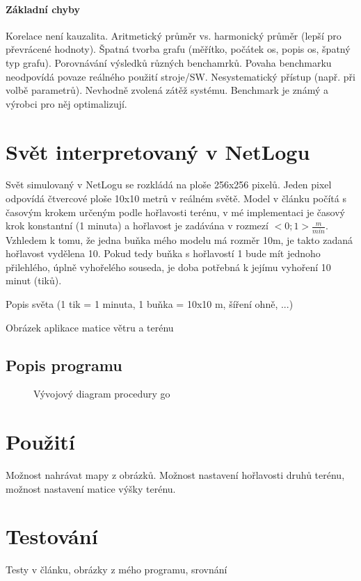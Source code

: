 \documentclass[11pt,a4paper]{scrartcl}
\begin{document}
	
	\paragraph{Základní chyby} Korelace není kauzalita. Aritmetický průměr vs. harmonický průměr (lepší pro převrácené hodnoty). Špatná tvorba grafu (měřítko, počátek os, popis os, špatný typ grafu). Porovnávání výsledků různých benchamrků. Povaha benchmarku neodpovídá povaze reálného použití stroje/SW. Nesystematický přístup (např. při volbě parametrů). Nevhodně zvolená zátěž systému. Benchmark je známý a výrobci pro něj optimalizují.
	
	\section{Svět interpretovaný v NetLogu}
	Svět simulovaný v NetLogu se rozkládá na ploše 256x256 pixelů. Jeden pixel odpovídá čtvercové ploše 10x10 metrů v reálném světě. Model v článku počítá s časovým krokem určeným podle hořlavosti terénu, v mé implementaci je časový krok konstantní (1 minuta) a hořlavost je zadávána v rozmezí $<0;1> \frac{m}{min}$. Vzhledem k tomu, že jedna buňka mého modelu má rozměr 10m, je takto zadaná hořlavost vydělena 10. Pokud tedy buňka s hořlavostí 1 bude mít jednoho přilehlého, úplně vyhořelého souseda, je doba potřebná k jejímu vyhoření 10 minut (tiků). 
	
	
	Popis světa (1 tik = 1 minuta, 1 buňka = 10x10 m, šíření ohně, ...)
	
	Obrázek aplikace matice větru a terénu
	
	\subsection{Popis programu}
	\begin{figure}
		\centering
		\caption{Vývojový diagram procedury go}
		\label{fig:go-procedure}
	\end{figure}
	
	
	\section{Použití}
	Možnost nahrávat mapy z obrázků. Možnost nastavení hořlavosti druhů terénu, možnost nastavení matice výšky terénu.
	
	\section{Testování}
	Testy v článku, obrázky z mého programu, srovnání
	
\end{document}
